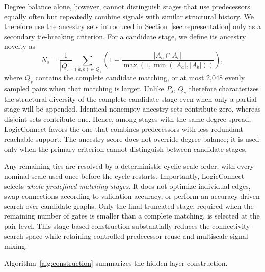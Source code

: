 Degree balance alone, however, cannot distinguish stages that use predecessors
equally often but repeatedly combine signals with similar structural history.
We therefore use the ancestry sets introduced in
Section~\ref{sec:representation} only as a secondary tie-breaking criterion.
For a candidate stage, we define its ancestry novelty as
%
\begin{equation}
N_s =
\frac{1}{|Q_s|}
\sum_{(a,b)\in Q_s}
\left(
1-
\frac{|A_a\cap A_b|}
{\max\!\left(1,\min(|A_a|,|A_b|)\right)}
\right),
\label{eq:ancestry_novelty}
\end{equation}
%
where $Q_s$ contains the complete candidate matching, or at most 2,048
evenly sampled pairs when that matching is larger. Unlike $P_s$, $Q_s$
therefore characterizes the structural diversity of the complete candidate
stage even when only a partial stage will be appended. Identical nonempty
ancestry sets
contribute zero, whereas disjoint sets contribute one. Hence, among stages
with the same degree spread, LogicConnect favors the one that combines
predecessors with less redundant reachable support. The ancestry score does
not override degree balance; it is used only when the primary criterion
cannot distinguish between candidate stages.

Any remaining ties are resolved by a deterministic cyclic scale order, with
every nominal scale used once before the cycle restarts. Importantly,
LogicConnect selects \emph{whole predefined matching stages}. It does not
optimize individual edges, swap connections according to validation accuracy,
or perform an accuracy-driven search over candidate graphs. Only the final
truncated stage, required when the remaining number of gates is smaller than a
complete matching, is selected at the pair level. This stage-based
construction substantially reduces the connectivity search space while
retaining controlled predecessor reuse and multiscale signal mixing.

Algorithm~\ref{alg:construction} summarizes the hidden-layer construction.

